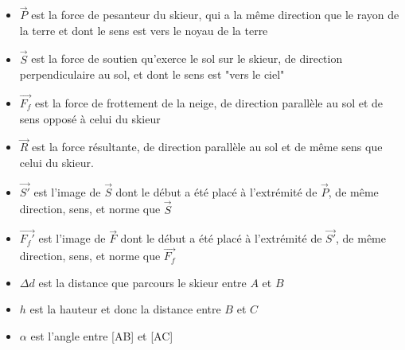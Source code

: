 \documentclass{article}
\begin{document}
\vspace{0.5cm}
\noindent
\begin{minipage}{0.4\textwidth}
\begin{center}
\end{center}
\end{minipage}
\hfill
\begin{minipage}{0.6\textwidth}
\begin{itemize}
    
    \item $\vec{P}$ est la force de pesanteur du skieur, qui a la même direction que le rayon de la terre et dont le sens est vers le noyau de la terre 
    \item $\vec{S}$ est la force de soutien qu'exerce le sol sur le skieur, de direction perpendiculaire au sol, et dont le sens est "vers le ciel"
    \item $\vec{F_f}$ est la force de frottement de la neige, de direction parallèle au sol et de sens opposé à celui du skieur
    \item $\vec{R}$ est la force résultante, de direction parallèle au sol et de même sens que celui du skieur.
    \item $\vec{S'}$ est l'image de $\vec{S}$ dont le début a été placé à l'extrémité de $\vec{P}$, de même direction, sens, et norme que $\vec{S}$
    \item $\vec{F_f'}$ est l'image de $\vec{F}$ dont le début a été placé à l'extrémité de $\vec{S'}$, de même direction, sens, et norme que $\vec{F_f}$
    \item $\Delta d$ est la distance que parcours le skieur entre $A$ et $B$
    \item $h$ est la hauteur et donc la distance entre $B$ et $C$
    \item $\alpha$ est l'angle entre [AB] et [AC]
\end{itemize}
\end{minipage}
\end{document}
